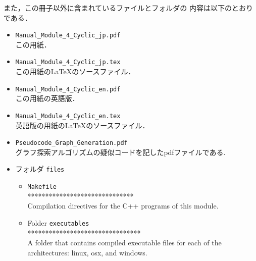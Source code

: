 \documentclass[11pt,titlepage,dvipdfmx,twoside]{jarticle}
\begin{document}
また，この冊子以外に含まれているファイルとフォルダの
内容は以下のとおりである．
%
\begin{itemize}
 \item {\tt Manual\_Module\_4\_Cyclic\_jp.pdf}\\
  この用紙．
 \item {\tt Manual\_Module\_4\_Cyclic\_jp.tex}\\
  この用紙の\LaTeX のソースファイル．
 \item {\tt Manual\_Module\_4\_Cyclic\_en.pdf}\\
  この用紙の英語版．
 \item {\tt Manual\_Module\_4\_Cyclic\_en.tex}\\
 英語版の用紙の\LaTeX のソースファイル．
\item{ {\tt Pseudocode\_Graph\_Generation.pdf}}\\
 グラフ探索アルゴリズムの疑似コードを記したpdfファイルである.
 
 \item フォルダ {\tt files}
 \begin{itemize}
 \item {\tt Makefile} \\
    ******************************\\
    Compilation directives for the C++ programs of this module.
    
    \item Folder {\tt executables}\\
    ********************************\\
    A folder that contains compiled executable files for 
    each of the architectures: linux, osx, and windows.
 

\end{itemize}
\end{itemize}
\end{document}
